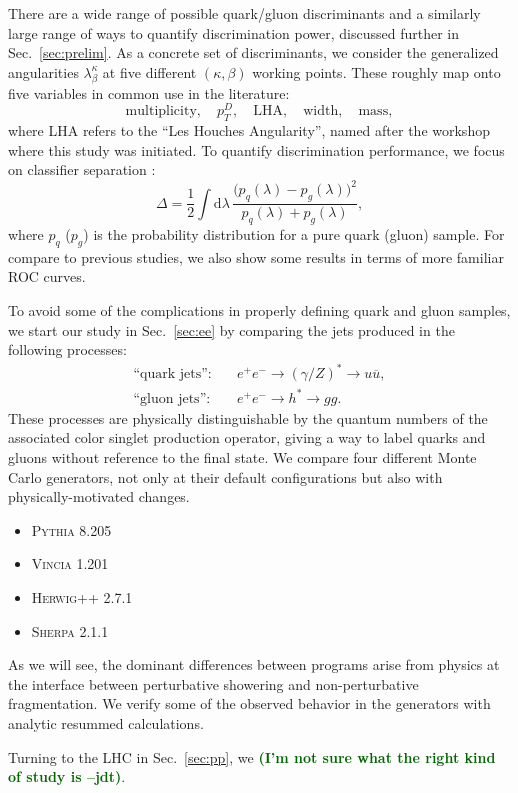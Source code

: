 \documentclass[11pt,letterpaper]{article}
\newcommand{\df}{\text{d}}
\DeclareRobustCommand{\Sec}[1]{Sec.~\ref{#1}}
\newcommand{\be}{\begin{equation}}
\newcommand{\ee}{\end{equation}}
\newcommand{\jdt}[1]{\textbf{\textcolor{darkgreen}{(#1 --jdt)}}}
\begin{document}
There are a wide range of possible quark/gluon discriminants and a similarly large range of ways to quantify discrimination power, discussed further in  \Sec{sec:prelim}.  As a concrete set of discriminants, we consider the generalized angularities $\lambda_\beta^\kappa$ \cite{} at five different $(\kappa, \beta)$ working points.  These roughly map onto five variables in common use in the literature:
\be
\text{multiplicity}, \quad p_T^D, \quad \text{LHA}, \quad \text{width}, \quad \text{mass},
\ee
where LHA refers to the ``Les Houches Angularity'', named after the workshop where this study was initiated.  To quantify discrimination performance, we focus on classifier separation \cite{}:
\be
\Delta =  \frac{1}{2} \int \df \lambda \, \frac{\bigl(p_q(\lambda) - p_g(\lambda)\bigr)^2}{p_q(\lambda) + p_g(\lambda)},
\ee
where $p_q$ ($p_g$) is the probability distribution for a pure quark (gluon) sample.   For compare to previous studies, we also show some results in terms of more familiar ROC curves.

To avoid some of the complications in properly defining quark and gluon samples, we start our study in \Sec{sec:ee} by comparing the jets produced in the following processes:
\begin{align}
\text{``quark jets''}: \quad & e^+e^- \to (\gamma/Z)^* \to u \overline{u}, \\
\text{``gluon jets''}: \quad & e^+e^- \to h^* \to g g.
\end{align}
These processes are physically distinguishable by the quantum numbers of the associated color singlet production operator, giving a way to label quarks and gluons without reference to the final state.  We compare four different Monte Carlo generators, not only at their default configurations but also with physically-motivated changes.
\begin{itemize}
\item \textsc{Pythia 8.205} \cite{}
\item \textsc{Vincia 1.201} \cite{}
\item \textsc{Herwig++ 2.7.1} \cite{}
\item \textsc{Sherpa 2.1.1} \cite{}
\end{itemize}
As we will see, the dominant differences between programs arise from physics at the interface between perturbative showering and non-perturbative fragmentation.  We verify some of the observed behavior in the generators with analytic resummed calculations.

Turning to the LHC in \Sec{sec:pp}, we  \jdt{I'm not sure what the right kind of study is}.
\end{document}
